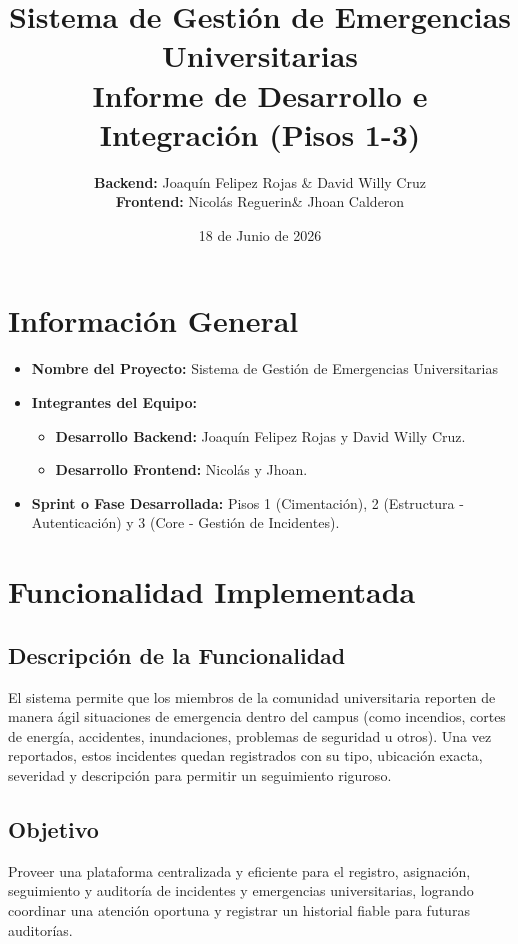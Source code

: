 \documentclass[11pt,a4paper]{article}
\title{
  \textbf{Sistema de Gestión de Emergencias Universitarias}\\
  \large Informe de Desarrollo e Integración (Pisos 1-3)
}
\author{
  \textbf{Backend:} Joaquín Felipez Rojas \& David Willy Cruz \\
  \textbf{Frontend:} Nicolás Reguerin\& Jhoan Calderon
}
\date{18 de Junio de 2026}
\begin{document}
\maketitle
\tableofcontents
\newpage

\section{Información General}
\begin{itemize}
    \item \textbf{Nombre del Proyecto:} Sistema de Gestión de Emergencias Universitarias
    \item \textbf{Integrantes del Equipo:}
    \begin{itemize}
        \item \textbf{Desarrollo Backend:} Joaquín Felipez Rojas y David Willy Cruz.
        \item \textbf{Desarrollo Frontend:} Nicolás y Jhoan.
    \end{itemize}
    \item \textbf{Sprint o Fase Desarrollada:} Pisos 1 (Cimentación), 2 (Estructura - Autenticación) y 3 (Core - Gestión de Incidentes).
\end{itemize}

\section{Funcionalidad Implementada}
\subsection{Descripción de la Funcionalidad}
El sistema permite que los miembros de la comunidad universitaria reporten de manera ágil situaciones de emergencia dentro del campus (como incendios, cortes de energía, accidentes, inundaciones, problemas de seguridad u otros). Una vez reportados, estos incidentes quedan registrados con su tipo, ubicación exacta, severidad y descripción para permitir un seguimiento riguroso.

\subsection{Objetivo}
Proveer una plataforma centralizada y eficiente para el registro, asignación, seguimiento y auditoría de incidentes y emergencias universitarias, logrando coordinar una atención oportuna y registrar un historial fiable para futuras auditorías.
\end{document}
